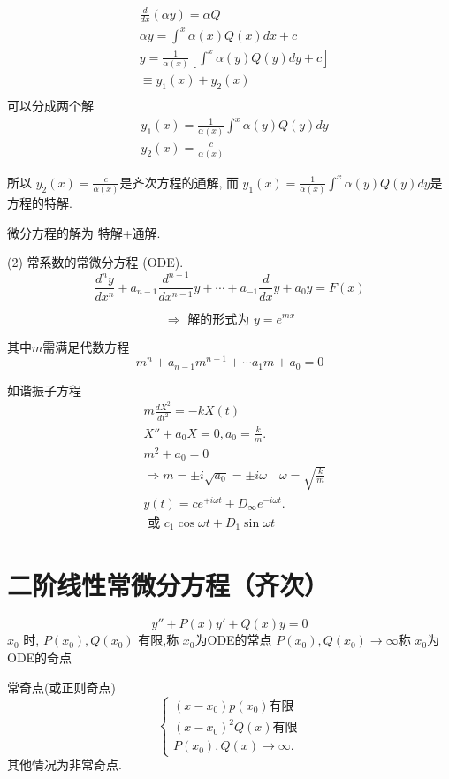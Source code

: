 $$
\begin{aligned}
& \frac{d}{d x}(\alpha y)=\alpha Q \\
& \alpha y=\int^x \alpha(x) Q(x) d x+c \\
& y=\frac{1}{\alpha(x)}\left[\int^x \alpha(y) Q(y) d y+c\right] \\
& \equiv y_1(x)+y_2(x) \\
\end{aligned}
$$
可以分成两个解
$$
\begin{aligned}
& y_1(x)=\frac{1}{\alpha(x)} \int^x \alpha(y) Q(y) d y \\
& y_2(x)=\frac{c}{\alpha(x)}
\end{aligned}
$$

所以
$y_2(x)=\frac{c}{\alpha(x)}$是齐次方程的通解,
而 $y_1(x)=\frac{1}{\alpha(x)} \int^x \alpha(y) Q(y) d y$是方程的特解.

微分方程的解为
特解+通解.


(2) 常系数的常微分方程 (ODE).
\begin{equation}
\frac{d^n y}{d x^n}+a_{n-1}\frac{d^{n-1} }{d x^{n-1}} y  + \cdots +a_{-1} \frac{d}{d x} y+a_0 y=F(x)
\end{equation}

$$
\Rightarrow \text { 解的形式为 } y=e^{m x}
$$

其中$m$需满足代数方程
$$
m^n+a_{n-1} m^{n-1}+\cdots a_1 m+a_0=0
$$

如谐振子方程
$$
\begin{aligned}
& m \frac{d X^2}{d t^2}=-k X(t) \\
& X''+a_0 X=0, a_0=\frac{k}{m} . \\
& m^2+a_0=0 \\
& \Rightarrow m= \pm i \sqrt{a_0}= \pm i \omega \quad \omega=\sqrt{\frac{k}{m}} \\
& y(t)=c e^{+i \omega t}+D_{\infty} e^{-i \omega t} . \\
& \text { 或 } c_1 \cos \omega t+D_1 \sin \omega t
\end{aligned}
$$


\section{二阶线性常微分方程（齐次）}
$$
y''+P(x) y '+Q(x) y=0
$$
$x_0$ 时, $P\left(x_0\right), Q\left(x_0\right)$ 有限,称 $x_0$为ODE的常点
$P\left(x_0\right), Q\left(x_0\right) \rightarrow \infty$称 $x_0$为ODE的奇点

常奇点(或正则奇点) $$\left\{\begin{array}{l}
    \left(x-x_0\right) p\left(x_0\right) \text{有限}
    \\
    \left(x-x_0\right)^2 Q(x) \text{有限}
    \\ P\left(x_0\right), Q(x) \rightarrow \infty .\end{array}
    \right.$$
其他情况为非常奇点.


